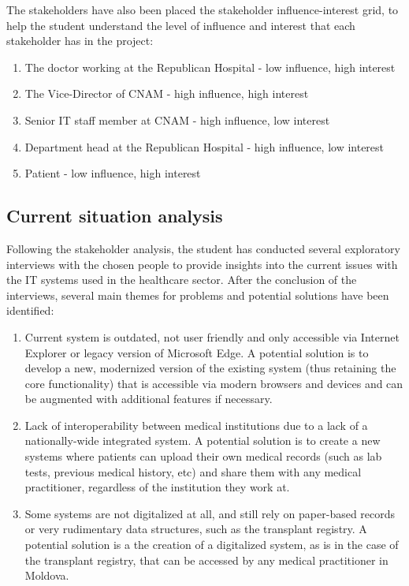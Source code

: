 The stakeholders have also been placed the stakeholder influence-interest grid, to help the student understand the level of influence and interest that each stakeholder has in the project:

\begin{enumerate}
    \item The doctor working at the Republican Hospital - low influence, high interest
    \item The Vice-Director of CNAM - high influence, high interest
    \item Senior IT staff member at CNAM - high influence, low interest
    \item Department head at the Republican Hospital - high influence, low interest
    \item Patient - low influence, high interest
\end{enumerate}

\subsection{Current situation analysis}

Following the stakeholder analysis, the student has conducted several exploratory interviews with the chosen people to provide insights into the current issues with the IT systems used in the healthcare sector. After the conclusion of the interviews, several main themes for problems and potential solutions have been identified:

\begin{enumerate}
    \item Current system is outdated, not user friendly and only accessible via Internet Explorer or legacy version of Microsoft Edge. A potential solution is to develop a new, modernized version of the existing system (thus retaining the core functionality) that is accessible via modern browsers and devices and can be augmented with additional features if necessary.
    \item Lack of interoperability between medical institutions due to a lack of a nationally-wide integrated system. A potential solution is to create a new systems where patients can upload their own medical records (such as lab tests, previous medical history, etc) and share them with any medical practitioner, regardless of the institution they work at. 
    \item Some systems are not digitalized at all, and still rely on paper-based records or very rudimentary data structures, such as the transplant registry. A potential solution is a the creation of a digitalized system, as is in the case of the transplant registry, that can be accessed by any medical practitioner in Moldova.
\end{enumerate}

